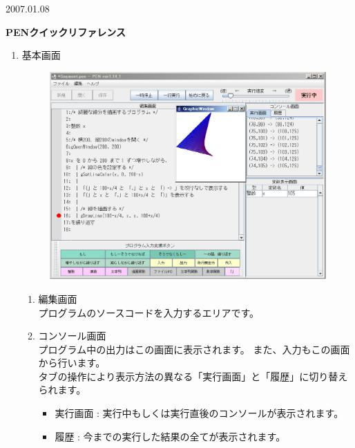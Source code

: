 \documentclass[11pt,a4j]{jarticle}
\begin{document}
\noindent
\begin{flushright}
{\small	2007.01.08}
\end{flushright}
\begin{center}
{\large\bf PENクイックリファレンス}
\end{center}

\begin{enumerate} \itemsep 0pt  \parskip 0pt
\item 基本画面 \\
\begin{figure}[htbp]
  \begin{center}
    \vspace{-0.5cm}
    \includegraphics[width=12.0cm]{./eps/pen001.eps}
    \vspace{-1.0cm}
  \end{center}
\end{figure}
  
\begin{enumerate} \itemsep 0pt  \parskip 0pt
\item 編集画面 \\
プログラムのソースコードを入力するエリアです。 

\vspace{0.2cm}

\item コンソール画面 \\
プログラム中の出力はこの画面に表示されます。
また、入力もこの画面から行います。 \\
タブの操作により表示方法の異なる「実行画面」と「履歴」に切り替えられます。 
\begin{itemize} \itemsep 0pt  \parskip 0pt
\item 実行画面 : 実行中もしくは実行直後のコンソールが表示されます。
\item 履歴     : 今までの実行した結果の全てが表示されます。
\end{itemize}


\end{enumerate}
\end{enumerate}
\end{document}
